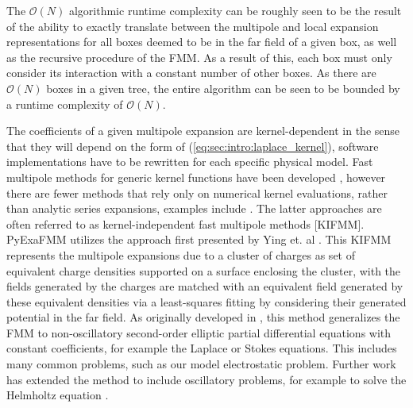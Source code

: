 \documentclass{IEEEcsmag}
\begin{document}
The $\mathcal{O}(N)$ algorithmic runtime complexity can be roughly seen to be the result of the ability to exactly translate between the multipole and local expansion representations for all boxes deemed to be in the far field of a given box, as well as the recursive procedure of the FMM. As a result of this, each box must only consider its interaction with a constant number of other boxes. As there are $\mathcal{O}(N)$ boxes in a given tree, the entire algorithm can be seen to be bounded by a runtime complexity of $\mathcal{O}(N)$.

The coefficients of a given multipole expansion are kernel-dependent in the sense that they will depend on the form of (\ref{eq:sec:intro:laplace_kernel}), software implementations have to be rewritten for each specific physical model. Fast multipole methods for generic kernel functions have been developed \cite{Gimbutas2003}, however there are fewer methods that rely only on numerical kernel evaluations, rather than analytic series expansions, examples include \cite{Fong2009, Ying2004}. The latter approaches are often referred to as kernel-independent fast multipole methods [KIFMM]. PyExaFMM utilizes the approach first presented by Ying et. al \cite{Ying2004}. This KIFMM represents the multipole expansions due to a cluster of charges as set of equivalent charge densities supported on a surface enclosing the cluster, with the fields generated by the charges are matched with an equivalent field generated by these equivalent densities via a least-squares fitting by considering their generated potential in the far field. As originally developed in \cite{Ying2004}, this method generalizes the FMM to non-oscillatory second-order elliptic partial differential equations with constant coefficients, for example the Laplace or Stokes equations. This includes many common problems, such as our model electrostatic problem. Further work has extended the method to include oscillatory problems, for example to solve the Helmholtz equation \cite{Engquist2007}.
\end{document}
